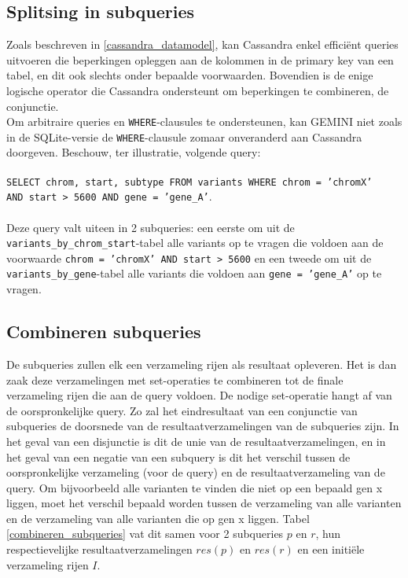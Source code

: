 \subsection{Splitsing in subqueries}
\label{splitsing_subqueries_conceptueel}

Zoals beschreven in \ref{cassandra_datamodel}, kan Cassandra enkel effici\"ent queries uitvoeren die beperkingen opleggen aan de kolommen in de primary key van een tabel, en dit ook slechts onder bepaalde voorwaarden. Bovendien is de enige logische operator die Cassandra ondersteunt om beperkingen te combineren, de conjunctie.\\
Om arbitraire queries en \texttt{WHERE}-clausules te ondersteunen, kan GEMINI niet zoals in de SQLite-versie de \texttt{WHERE}-clausule zomaar onveranderd aan Cassandra doorgeven. Beschouw, ter illustratie, volgende query:\\\\
\texttt{SELECT chrom, start, subtype FROM variants WHERE chrom = 'chromX' \\AND start > 5600 AND gene = 'gene\_A'}.\\\\
Deze query valt uiteen in 2 subqueries: een eerste om uit de \texttt{variants\_by\_chrom\_start}-tabel alle variants op te vragen die voldoen aan de voorwaarde \texttt{chrom = 'chromX' AND start > 5600} en een tweede om uit de \texttt{variants\_by\_gene}-tabel alle variants die voldoen aan \texttt{gene = 'gene\_A'} op te vragen.\\

\subsection{Combineren subqueries}
\label{comb_subq_concept}
De subqueries zullen elk een verzameling rijen als resultaat opleveren. Het is dan zaak deze verzamelingen met set-operaties te combineren tot de finale verzameling rijen die aan de query voldoen. De nodige set-operatie hangt af van de oorspronkelijke query. Zo zal het eindresultaat van een conjunctie van subqueries de doorsnede van de resultaatverzamelingen van de subqueries zijn. In het geval van een disjunctie is dit de unie van de resultaatverzamelingen, en in het geval van een negatie van een subquery is dit het verschil tussen de oorspronkelijke verzameling (voor de query) en de resultaatverzameling van de query. Om bijvoorbeeld alle varianten te vinden die niet op een bepaald gen x liggen, moet het verschil bepaald worden tussen de verzameling van alle varianten en de verzameling van alle varianten die op gen x liggen. Tabel \ref{combineren_subqueries} vat dit samen voor 2 subqueries $p$ en $r$, hun respectievelijke resultaatverzamelingen $res(p)$ en $res(r)$ en een initi\"ele verzameling rijen $I$.

